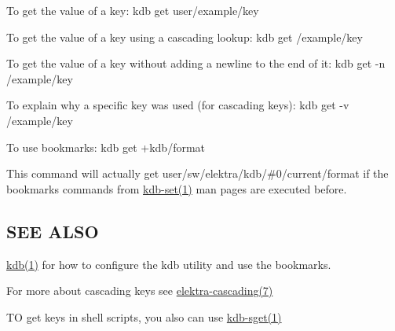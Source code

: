 To get the value of a key\+: {\ttfamily kdb get user/example/key}

To get the value of a key using a cascading lookup\+: {\ttfamily kdb get /example/key}

To get the value of a key without adding a newline to the end of it\+: {\ttfamily kdb get -\/n /example/key}

To explain why a specific key was used (for cascading keys)\+: {\ttfamily kdb get -\/v /example/key}

To use bookmarks\+: {\ttfamily kdb get +kdb/format}

This command will actually get {\ttfamily user/sw/elektra/kdb/\#0/current/format} if the bookmarks commands from \hyperlink{md_doc_help_kdb-set_doc_help_kdb-set_md}{kdb-\/set(1)} man pages are executed before.

\subsection*{S\+E\+E A\+L\+S\+O}


\begin{DoxyItemize}
\item \hyperlink{md_doc_help_kdb_doc_help_kdb_md}{kdb(1)} for how to configure the kdb utility and use the bookmarks.
\item For more about cascading keys see \hyperlink{md_doc_help_elektra-cascading_doc_help_elektra-cascading_md}{elektra-\/cascading(7)}
\item T\+O get keys in shell scripts, you also can use \hyperlink{md_doc_help_kdb-sget_doc_help_kdb-sget_md}{kdb-\/sget(1)} 
\end{DoxyItemize}